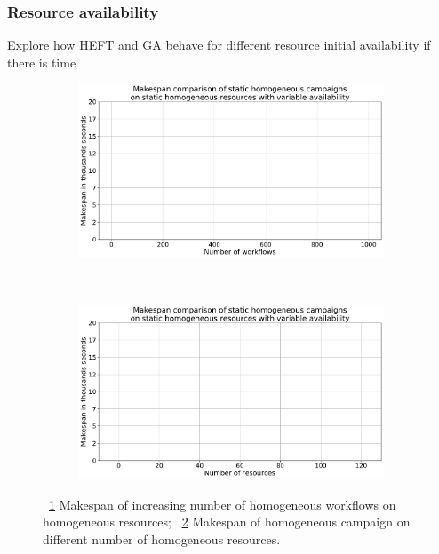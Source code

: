 \subsubsection{Resource availability}

Explore how HEFT and GA behave for different resource initial availability if there is time
\begin{figure}[ht!]
    \centering
    \begin{subfigure}[b]{0.45\textwidth}
        \includegraphics[width=.95\textwidth]{figures/campaign/StHomoCampaigns_4VarHomoResources.pdf}
        \caption{}
        \label{fig:StHomoCampaigns_4VarHomoResources}
    \end{subfigure}%
    ~ 
    \begin{subfigure}[b]{0.45\textwidth}
        \includegraphics[width=\linewidth]{figures/campaign/VarHomoResources_StHomoCampaigns.pdf}
        \caption{}
        \label{fig:VarHomoResources_StHomoCampaigns}
    \end{subfigure}
    \caption{~\ref{fig:StHomoCampaigns_4VarHomoResources} Makespan of increasing number of homogeneous workflows on homogeneous resources;
    ~\ref{fig:VarHomoResources_StHomoCampaigns} Makespan of homogeneous campaign on different number of homogeneous resources.}
    \label{fig:resource_avail}
\end{figure}

